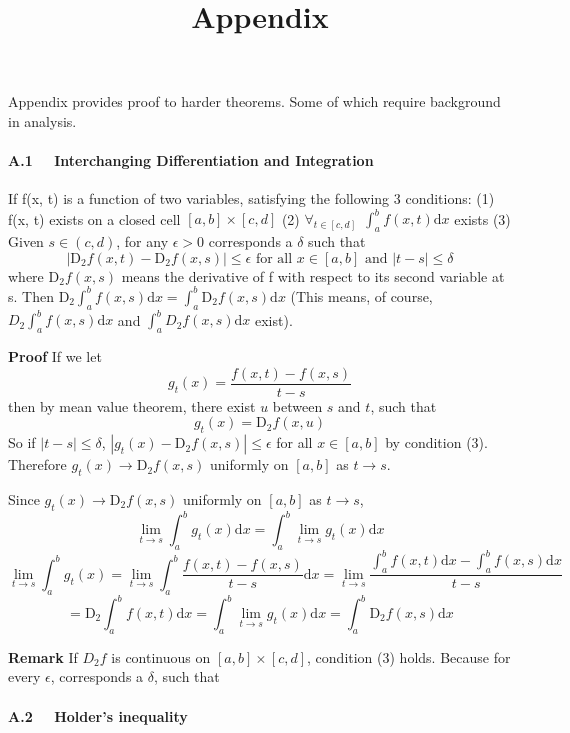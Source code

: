 \documentclass[a4paper,12pt]{article}
\begin{document}
\newpage
\title{\textbf{{\LARGE Appendix }}}

Appendix provides proof to harder theorems. Some of which require background in analysis. 


\paragraph{ A.1 \ \  Interchanging Differentiation and Integration}
If f(x, t) is a function of two variables, satisfying the following 3 conditions: 
(1) f(x, t) exists on a closed cell $[a, b] \times [c, d]$ 
(2) $\forall_{t\in[c, d] }\ \ \int_a^b f(x, t) \mathrm{d}x$ exists 
(3) Given $s \in (c, d)$, for any $\epsilon > 0$ corresponds a $\delta$ such that $$ | \mathrm{D}_2 f(x, t) - \mathrm{D}_2 f(x, s) | \leq \epsilon \text{ for all } x \in [a, b] \text{ and } | t - s | \leq \delta $$
where $\mathrm{D}_2 f(x, s)$ means the derivative of f with respect to its second variable at s.
Then $\mathrm{D}_2 \int_a^b f(x, s) \mathrm{d}x = \int_a^b \mathrm{D}_2 f(x, s) \mathrm{d}x$ (This means, of course, $D_2 \int_a^b f(x, s) \mathrm{d}x $ and $ \int_a^b D_2 f(x, s) \mathrm{d}x$ exist). 

\textbf{Proof} If we let
$$g_t(x) = \frac{f(x, t)-f(x, s)}{t-s}$$
then by mean value theorem, there exist $u$ between $s$ and $t$, such that
$$g_t(x)= \mathrm{D}_2 f(x, u)$$
So if $|t-s|\leq\delta$, $ |g_t(x) - \mathrm{D}_2 f(x, s) | \leq \epsilon $ for all $x \in [a, b]$ by condition (3). Therefore $g_t(x)\to \mathrm{D}_2 f(x, s)$ uniformly on $[a, b]$ as $t\to s$.

Since $g_t(x)\to \mathrm{D}_2 f(x, s)$ uniformly on $[a, b]$ as $t\to s$,
$$\lim_{t\to s}\int_a^b g_t(x) \mathrm{d}x = \int_a^b \lim_{t\to s} g_t(x) \mathrm{d}x $$
$$\lim_{t\to s}\int_a^b g_t(x) = \lim_{t\to s}\int_a^b \frac{f(x, t)-f(x, s)}{t-s} \mathrm{d}x = \lim_{t\to s} \frac{\int_a^b f(x, t) \mathrm{d}x - \int_a^b f(x, s) \mathrm{d}x}{t-s}$$
$$ = \mathrm{D}_2 \int_a^b f(x, t) \mathrm{d}x
= \int_a^b \lim_{t\to s} g_t(x) \mathrm{d}x = \int_a^b \mathrm{D}_2 f(x, s) \mathrm{d}x $$ 

\textbf{Remark}
If $D_2 f$ is continuous on $[a, b]\times [c, d]$, condition (3) holds. Because for every $\epsilon$, corresponds a $\delta$, such that

\paragraph{ A.2 \ \  Holder's inequality }
\end{document}
